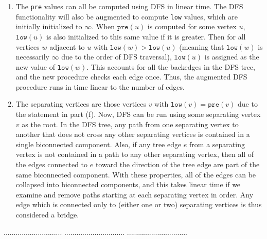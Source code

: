 \documentclass[a4paper,11pt]{article}
\begin{document}
\begin{enumerate}[label=(\alph*)]
    \item
        The \texttt{pre} values can all be computed using DFS in linear time. The DFS functionality will also be augmented to compute \texttt{low} values, which are initially initialized to $\infty$. When $\texttt{pre}(u)$ is computed for some vertex $u$, $\texttt{low}(u)$ is also initialized to this same value if it is greater. Then for all vertices $w$ adjacent to $u$ with $\texttt{low}(w) > \texttt{low}(u)$ (meaning that $\texttt{low}(w)$ is necessarily $\infty$ due to the order of DFS traversal), $\texttt{low}(u)$ is assigned as the new value of $\texttt{low}(w)$. This accounts for all the backedges in the DFS tree, and the new procedure checks each edge once. Thus, the augmented DFS procedure runs in time linear to the number of edges.

    \item
        The separating vertices are those vertices $v$ with $\texttt{low}(v) = \texttt{pre}(v)$ due to the statement in part (f). Now, DFS can be run using some separating vertex $v$ as the root. In the DFS tree, any path from one separating vertex to another that does not cross any other separating vertices is contained in a single biconnected component. Also, if any tree edge $e$ from a separating vertex is not contained in a path to any other separating vertex, then all of the edges connected to $e$ toward the direction of the tree edge are part of the same biconnected component. With these properties, all of the edges can be collapsed into biconnected components, and this takes linear time if we examine and remove paths starting at each separating vertex in order. Any edge which is connected only to (either one or two) separating vertices is thus considered a bridge.
\end{enumerate}

\pagebreak

 $.............................$
 $..............................$
          $..............................$\\

\bigskip
\end{document}
